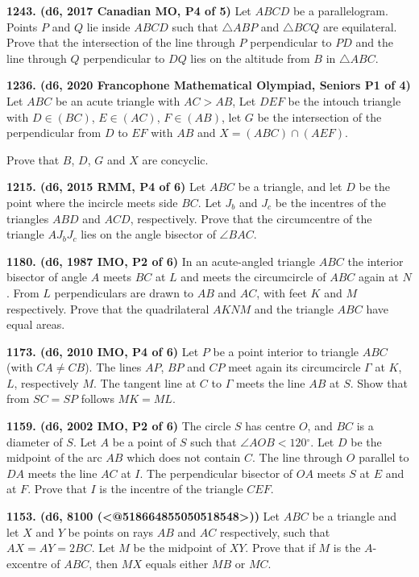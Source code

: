 \documentclass{article}
\begin{document}
\textbf{1243. (\color{red}d6\color{black}, 2017 Canadian MO, P4 of 5)} Let $ABCD$ be a parallelogram. Points $P$ and $Q$ lie inside $ABCD$ such that $\bigtriangleup ABP$ and $\bigtriangleup{BCQ}$ are equilateral. Prove that the intersection of the line through $P$ perpendicular to $PD$ and the line through $Q$ perpendicular to $DQ$ lies on the altitude from $B$ in $\bigtriangleup{ABC}$.

\textbf{1236. (\color{red}d6\color{black}, 2020 Francophone Mathematical Olympiad, Seniors P1 of 4)} Let $ABC$ be an acute triangle with $AC>AB$, Let $DEF$ be the intouch triangle with $D \in (BC)$, $E \in (AC)$, $F \in (AB)$, let $G$ be the intersection of the perpendicular from $D$ to $EF$ with $AB$ and $X=(ABC)\cap (AEF)$.

Prove that $B$, $D$, $G$ and $X$ are concyclic.

\textbf{1215. (\color{red}d6\color{black}, 2015 RMM, P4 of 6)} Let $ABC$ be a triangle, and let $D$ be the point where the incircle meets side $BC$. Let $J_b$ and $J_c$ be the incentres of the triangles $ABD$ and $ACD$, respectively. Prove that the circumcentre of the triangle $AJ_bJ_c$ lies on the angle bisector of $\angle BAC$.

\textbf{1180. (\color{red}d6\color{black}, 1987 IMO, P2 of 6)} In an acute-angled triangle $ABC$ the interior bisector of angle $A$ meets $BC$ at $L$ and meets the circumcircle of $ABC$ again at $N$. From $L$ perpendiculars are drawn to $AB$ and $AC$, with feet $K$ and $M$ respectively. Prove that the quadrilateral $AKNM$ and the triangle $ABC$ have equal areas.

\textbf{1173. (\color{red}d6\color{black}, 2010 IMO, P4 of 6)} Let $P$ be a point interior to triangle $ABC$ (with $CA \neq CB$). The lines $AP$, $BP$ and $CP$ meet again its circumcircle $\Gamma$ at $K$, $L$, respectively $M$. The tangent line at $C$ to $\Gamma$ meets the line $AB$ at $S$. Show that from $SC = SP$ follows $MK = ML$.

\textbf{1159. (\color{red}d6\color{black}, 2002 IMO, P2 of 6)} The circle $S$ has centre $O$, and $BC$ is a diameter of $S$. Let $A$ be a point of $S$ such that $\angle AOB<120{{}^\circ}$. Let $D$ be the midpoint of the arc $AB$ which does not contain $C$. The line through $O$ parallel to $DA$ meets the line $AC$ at $I$. The perpendicular bisector of $OA$ meets $S$ at $E$ and at $F$. Prove that $I$ is the incentre of the triangle $CEF.$

\textbf{1153. (\color{red}d6\color{black}, 8100 (<@518664855050518548>))} Let $ABC$ be a triangle and let $X$ and $Y$ be points on rays $AB$ and $AC$ respectively, such that $AX = AY = 2BC$. Let $M$ be the midpoint of $XY$. Prove that if $M$ is the $A$-excentre of $ABC$, then $MX$ equals either $MB$ or $MC$.
\end{document}
